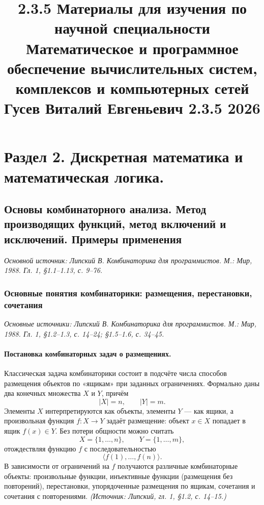 \documentclass[a4paper,12pt]{article}
\title{2.3.5 Материалы для изучения по научной специальности \\
Математическое и программное обеспечение вычислительных систем, комплексов и компьютерных сетей \\
Гусев Виталий Евгеньевич 2.3.5 2026}
\date{}
\begin{document}
\maketitle

\tableofcontents
\newpage

\setcounter{section}{2} %
\section{Раздел 2. Дискретная математика и математическая логика.}

\subsection{Основы комбинаторного анализа. Метод производящих функций, метод включений и исключений. Примеры применения}

\noindent\textit{Основной источник: Липский В. Комбинаторика для программистов. М.: Мир, 1988. Гл. 1, §1.1--1.13, с. 9--76.}

\subsubsection{Основные понятия комбинаторики: размещения, перестановки, сочетания}

\noindent\textit{Основные источники: Липский В. Комбинаторика для программистов. М.: Мир, 1988. Гл. 1, §1.2--1.3, с. 14--24; §1.5--1.6, с. 34--45.}

\paragraph{Постановка комбинаторных задач о размещениях.}
Классическая задача комбинаторики состоит в подсчёте числа способов размещения объектов по «ящикам» при заданных ограничениях. Формально даны два конечных множества \(X\) и \(Y\), причём
\[
|X|=n,\qquad |Y|=m.
\]
Элементы \(X\) интерпретируются как объекты, элементы \(Y\) --- как ящики, а произвольная функция \(f:X\to Y\) задаёт размещение: объект \(x\in X\) попадает в ящик \(f(x)\in Y\). Без потери общности можно считать
\[
X=\{1,\dots,n\},\qquad Y=\{1,\dots,m\},
\]
отождествляя функцию \(f\) с последовательностью
\[
\langle f(1),\dots,f(n)\rangle.
\]
В зависимости от ограничений на \(f\) получаются различные комбинаторные объекты: произвольные функции, инъективные функции (размещения без повторений), перестановки, упорядоченные размещения по ящикам, сочетания и сочетания с повторениями.
\textit{(Источник: Липский, гл. 1, §1.2, с. 14--15.)}
\end{document}
